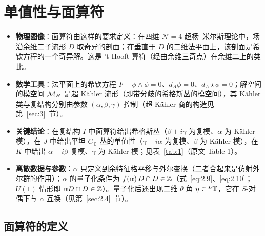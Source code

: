 

\section{单值性与面算符}

\label{sec:2}

\begin{keytakeaways}
  \begin{itemize}[leftmargin=1.4em,itemsep=2pt,topsep=2pt]
    \item \textbf{物理图像}：面算符由这样的要求定义：在四维 $\mathcal N=4$ 超杨–米尔斯理论中，场沿余维二子流形 $D$ 取奇异的剖面；在垂直于 $D$ 的二维法平面上，该剖面是希钦方程的一个奇异解。这是 't Hooft 算符（经由余维三奇点）在余维二上的类比。
    \item \textbf{数学工具}：法平面上的希钦方程 $F-\phi\wedge\phi=0$、$d_A\phi=0$、$d_A\star\phi=0$；解空间的模空间 ${{\mathcal{M}}_H}$ 是超 Kähler 流形（即带分歧的希格斯丛的模空间），其 Kähler 类与复结构分别由参数 $(\alpha,\beta,\gamma)$ 控制（超 Kähler 商的构造见第~\ref{sec:3}~节）。
    \item \textbf{关键结论}：在复结构 $I$ 中面算符给出希格斯丛（$\beta+i\gamma$ 为复模、$\alpha$ 为 Kähler 模），在 $J$ 中给出平坦 $G_{\mathbb{C}}$-丛的单值性（$\gamma+i\alpha$ 为复模、$\beta$ 为 Kähler 模），在 $K$ 中给出 $\alpha+i\beta$ 复模、$\gamma$ 为 Kähler 模；见表~\ref{tab:1}（原文 Table 1）。
    \item \textbf{离散数据与参数}：$\alpha$ 只定义到余特征格平移与外尔变换（二者合起来是仿射外尔群的作用）；$\alpha$ 的量子化条件为 $f(\alpha)\,D\cap D\in{\mathbb{Z}}$（式~\eqref{eq:2.9}、\eqref{eq:2.10}；$U(1)$ 情形即 $\alpha D\cap D\in{\mathbb{Z}}$）。量子化后还出现二维 $\theta$ 角 $\eta\in{}^L{\mathbb{T}}$，它在 $S$-对偶下与 $\alpha$ 互换（见第~\ref{sec:2.4}~节）。
  \end{itemize}
\end{keytakeaways}


\subsection{面算符的定义}
\label{sec:2.1}


